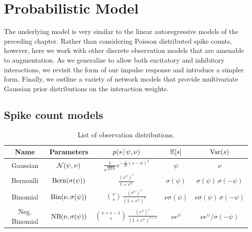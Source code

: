 \section{Probabilistic Model}
The underlying model is very similar to the linear autoregressive 
models of the preceding chapter. Rather than considering Poisson 
distributed spike counts, however, here we work with other discrete 
observation models that are amenable to \polyagamma augmentation. 
As we generalize to allow both excitatory and inhibitory interactions, 
we revisit the form of our impulse response and introduce a simpler
form. Finally, we outline a variety of network models that provide 
multivariate Gaussian prior distributions on the interaction weights.

\subsection{Spike count models}

\begin{table}
\begin{center}
\begin{tabular}{c|c|c|c|c}
  \textbf{Name} & Parameters & $p(s \,|\, \psi, \nu)$ & $\mathbb{E}[s]$ & $\mathrm{Var}(s)$ \\
  \hline
  Gaussian 
  & $\mathcal{N}(\psi, \nu)$ 
  & $\frac{1}{\sqrt{2 \pi \nu}} e^{ -\frac{1}{2 \nu} (s - \psi)^2}$
  & $\psi$ & $\nu$ \\
  Bernoulli 
  & $\mathrm{Bern}(\sigma(\psi))$ 
  & $\frac{(e^\psi)^s}{1+e^\psi}$
  & $\sigma(\psi)$ & $\sigma(\psi) \, \sigma(-\psi)$ \\
  Binomial 
  & $\mathrm{Bin}(\nu, \sigma(\psi))$ 
  & ${\nu \choose s} \,\frac{(e^\psi)^s}{(1+e^\psi)^\nu}$
  & $\nu \sigma(\psi)$ & $\nu \sigma(\psi) \, \sigma(-\psi)$ \\
  Neg. Binomial 
  & $\mathrm{NB}(\nu, \sigma(\psi))$
  & ${\nu +s - 1 \choose s} \,\frac{(e^\psi)^s}{(1+e^\psi)^{\nu+s}}$
  & $\nu e^\psi$ & $\nu e^\psi / \sigma(-\psi)$ \\
\end{tabular}
\end{center}
\caption{List of observation distributions.}
\label{tab:obs_models}
\end{table}

